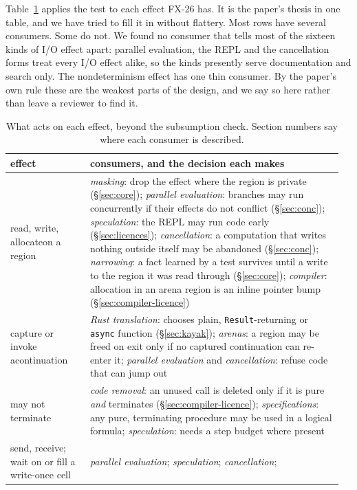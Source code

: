 \documentclass[acmsmall,screen,review]{acmart}
\newcommand{\cd}[1]{\texttt{#1}}
\newcommand{\fx}{FX-26}
\begin{document}
Table~\ref{tab:consumers} applies the test to each effect \fx{} has.
It is the paper's thesis in one table, and we have tried to fill it in
without flattery. Most rows have several consumers. Some do not. We
found no consumer that tells most of the sixteen kinds of I/O effect
apart: parallel evaluation, the REPL and the cancellation forms treat
every I/O effect alike, so the kinds presently serve documentation and
search only. The nondeterminism effect has one thin consumer. By the
paper's own rule these are the weakest parts of the design, and we say
so here rather than leave a reviewer to find it.

\begin{table}[t]
\caption{What acts on each effect, beyond the subsumption check.
Section numbers say where each consumer is described.}
\label{tab:consumers}
\small
\begin{tabular}{@{}p{0.23\linewidth}p{0.73\linewidth}@{}}
\toprule
effect & consumers, and the decision each makes\\
\midrule
read, write, allocate\newline on a region &
\emph{masking}: drop the effect where the region is private (\S\ref{sec:core});
\emph{parallel evaluation}: branches may run concurrently if their effects do not conflict (\S\ref{sec:conc});
\emph{speculation}: the REPL may run code early (\S\ref{sec:licences});
\emph{cancellation}: a computation that writes nothing outside itself may be abandoned (\S\ref{sec:conc});
\emph{narrowing}: a fact learned by a test survives until a write to the region it was read through (\S\ref{sec:core});
\emph{compiler}: allocation in an arena region is an inline pointer bump (\S\ref{sec:compiler-licence})\\[3pt]
capture or invoke a\newline continuation &
\emph{Rust translation}: chooses plain, \cd{Result}-returning or \cd{async} function (\S\ref{sec:kayak});
\emph{arenas}: a region may be freed on exit only if no captured continuation can re-enter it;
\emph{parallel evaluation} and \emph{cancellation}: refuse code that can jump out\\[3pt]
may not terminate &
\emph{code removal}: an unused call is deleted only if it is pure \emph{and} terminates (\S\ref{sec:compiler-licence});
\emph{specifications}: any pure, terminating procedure may be used in a logical formula;
\emph{speculation}: needs a step budget where present\\[3pt]
send, receive; wait on or fill a write-once cell &
\emph{parallel evaluation}; \emph{speculation}; \emph{cancellation};

\end{tabular}
\end{table}
\end{document}
